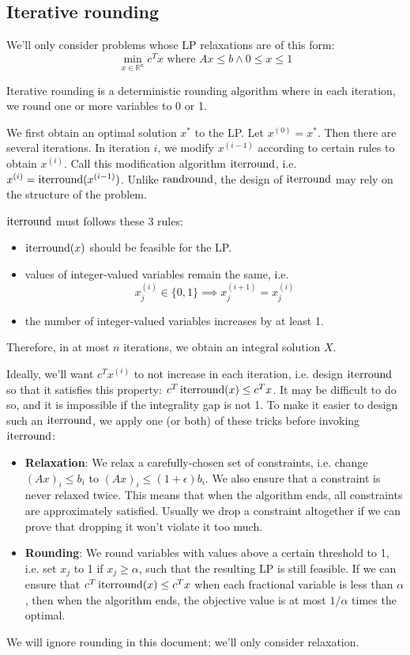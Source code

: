 \subsection{Iterative rounding}

We'll only consider problems whose LP relaxations are of this form:
\[ \min_{x \in \mathbb{R}^n} c^Tx \textrm{ where } Ax \le b \wedge 0 \le x \le 1 \]

Iterative rounding is a deterministic rounding algorithm
where in each iteration, we round one or more variables to 0 or 1.

We first obtain an optimal solution $x^*$ to the LP. Let $x^{(0)} = x^*$.
Then there are several iterations.
In iteration $i$, we modify $x^{(i-1)}$ according to certain rules to obtain $x^{(i)}$.
Call this modification algorithm $\operatorname{iterround}$, i.e. $x^{(i)} = \operatorname{iterround}(x^{(i-1)})$.
Unlike $\operatorname{randround}$, the design of $\operatorname{iterround}$ may rely on the structure of the problem.

$\operatorname{iterround}$ must follows these 3 rules:
\begin{itemize}
\item $\operatorname{iterround}(x)$ should be feasible for the LP.
\item values of integer-valued variables remain the same, i.e.
\[ x^{(i)}_j \in \{0, 1\} \implies x^{(i+1)}_j = x^{(i)}_j \]
\item the number of integer-valued variables increases by at least 1.
\end{itemize}
Therefore, in at most $n$ iterations, we obtain an integral solution $X$.

Ideally, we'll want $c^Tx^{(i)}$ to not increase in each iteration,
i.e. design $\operatorname{iterround}$ so that it satisfies this property: $c^T\operatorname{iterround}(x) \le c^Tx$.
It may be difficult to do so, and it is impossible if the integrality gap is not 1.
To make it easier to design such an $\operatorname{iterround}$,
we apply one (or both) of these tricks before invoking $\operatorname{iterround}$:
\begin{itemize}
\item \textbf{Relaxation}:
We relax a carefully-chosen set of constraints,
i.e. change $(Ax)_i \le b_i$ to $(Ax)_i \le (1+\epsilon)b_i$.
We also ensure that a constraint is never relaxed twice.
This means that when the algorithm ends, all constraints are approximately satisfied.
Usually we drop a constraint altogether if we can prove that
dropping it won't violate it too much.
\item \textbf{Rounding}:
We round variables with values above a certain threshold to 1,
i.e. set $x_j$ to 1 if $x_j \ge \alpha$, such that the resulting LP is still feasible.
If we can ensure that $c^T\operatorname{iterround}(x) \le c^Tx$ when each fractional variable
is less than $\alpha$, then when the algorithm ends,
the objective value is at most $1/\alpha$ times the optimal.
\end{itemize}
We will ignore rounding in this document; we'll only consider relaxation.

